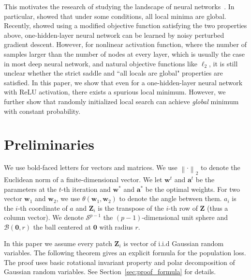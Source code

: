 \documentclass{article}
\newcommand{\secondlayer}{a}
\newcommand{\mat}[1]{\mathbf{#1}}
\newcommand{\vect}[1]{\mathbf{#1}}
\newcommand{\norm}[1]{\left\|#1\right\|}
\begin{document}
This motivates the research of studying the landscape of neural networks~\citep{kawaguchi2016deep,choromanska2015loss,hardt2016identity,haeffele2015global,mei2016landscape,freeman2016topology,safran2016quality,zhou2017landscape,nguyen2017loss,nguyen2017loss2,ge2017learning,zhou2017landscape,safran2017spurious}.
In particular, \citet{kawaguchi2016deep,hardt2016identity,zhou2017landscape,nguyen2017loss,nguyen2017loss2,feizi2017porcupine} showed that under some conditions, all local minima are global.
Recently, \citet{ge2017learning} showed using a modified objective function satisfying the two properties above, one-hidden-layer neural network can be learned by noisy perturbed gradient descent.
However, for nonlinear activation function, where the number of samples larger than the number of nodes at every layer, which is usually the case in most deep neural network, and natural objective functions like $\ell_2$, it is still unclear whether the strict saddle and ``all locals are global" properties are satisfied.
In this paper, we show that even for a one-hidden-layer neural network with ReLU activation, there exists a spurious local minimum.
However, we further show that randomly initialized local search can achieve \emph{global} minimum with constant probability.





\section{Preliminaries}
\label{sec:pre}
We use bold-faced letters for vectors and matrices.
We use $\norm{\cdot}_2$ to denote the Euclidean norm of a finite-dimensional vector.
We let $\vect{w}^t$ and $\vect{\secondlayer}^t$ be the parameters at the $t$-th iteration and $\vect{w}^*$ and $\vect{\secondlayer}^*$ be the optimal weights.
For two vector $\vect{w}_1$ and $\vect{w}_2$, we use $\theta\left(\vect{w}_1,\vect{w}_2\right)$ to denote the angle between them.
$\secondlayer_i$ is the $i$-th coordinate of $\secondlayer$ and $\mat{Z}_i$ is the transpose of the $i$-th row of $\mat{Z}$ (thus a column vector).
We denote $\mathcal{S}^{p-1}$  the $(p-1)$-dimensional unit sphere and $\mathcal{B}\left(\vect{0},r\right)$ the ball centered at $\vect{0}$ with radius $r$.

In this paper we assume every patch $\mat{Z}_i$ is vector of i.i.d Gaussian random variables.
The following theorem gives an explicit formula for the population loss.
The proof uses basic rotational invariant property and polar decomposition of Gaussian random variables.
See Section~\ref{sec:proof_formula} for details.
\end{document}
